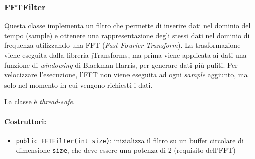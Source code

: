 \subsubsection{FFTFilter}
Questa classe implementa un filtro che permette di inserire dati nel dominio del tempo (sample) e ottenere una rappresentazione degli stessi dati nel dominio di frequenza utilizzando una FFT (\textit{Fast Fourier Transform}). La trasformazione viene eseguita dalla libreria jTransforms, ma prima viene applicata ai dati una funzione di \textit{windowing} di Blackman-Harris, per generare dati più puliti. Per velocizzare l'esecuzione, l'FFT non viene eseguita ad ogni \textit{sample} aggiunto, ma solo nel momento in cui vengono richiesti i dati.

La classe è \textit{thread-safe}.

\paragraph{Costruttori:}\begin{itemize}
	\item \texttt{public FFTFilter(int size)}: inizializza il filtro su un buffer circolare di dimensione \texttt{size}, che deve essere una potenza di 2 (requisito dell'FFT)
\end{itemize}

